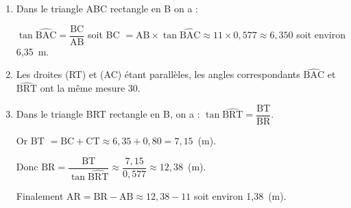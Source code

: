 \begin{enumerate}
\item %
Dans le triangle ABC rectangle en B on a :

$\tan \widehat{\text{BAC}} = \dfrac{\text{BC}}{\text{AB}}$ soit BC $ = \text{AB} \times \tan \widehat{\text{BAC}} \approx 11 \times 0,577 \approx 6,350$ soit environ 6,35~m.
\item  %
Les droites (RT) et (AC) étant parallèles, les angles correspondants $\widehat{\text{BAC}}$ et $\widehat{\text{BRT}}$ ont la même mesure 30\degres.
\item  %
Dans le triangle BRT rectangle en B, on a : $\tan \widehat{\text{BRT}} = \dfrac{\text{BT}}{\text{BR}}$.

Or BT $= \text{BC} + \text{CT} \approx  6,35 + 0,80 = 7,15$~(m).

Donc $\text{BR} = \dfrac{\text{BT}}{\tan \widehat{\text{BRT}}} \approx \dfrac{7,15}{0,577} \approx 12,38$~(m).

Finalement $\text{AR} = \text{BR} - \text{AB} \approx 12,38 - 11$ soit environ 1,38~(m). 
\end{enumerate}

\vspace{0,5cm}

